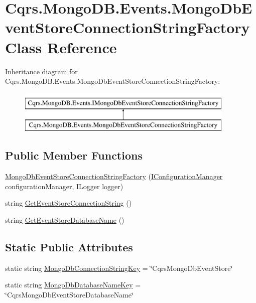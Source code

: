 \hypertarget{classCqrs_1_1MongoDB_1_1Events_1_1MongoDbEventStoreConnectionStringFactory}{}\section{Cqrs.\+Mongo\+D\+B.\+Events.\+Mongo\+Db\+Event\+Store\+Connection\+String\+Factory Class Reference}
\label{classCqrs_1_1MongoDB_1_1Events_1_1MongoDbEventStoreConnectionStringFactory}
Inheritance diagram for Cqrs.\+Mongo\+D\+B.\+Events.\+Mongo\+Db\+Event\+Store\+Connection\+String\+Factory\+:\begin{figure}[H]
\begin{center}
\leavevmode
\includegraphics[height=2.000000cm]{classCqrs_1_1MongoDB_1_1Events_1_1MongoDbEventStoreConnectionStringFactory}
\end{center}
\end{figure}
\subsection*{Public Member Functions}
\begin{DoxyCompactItemize}
\item 
\hyperlink{classCqrs_1_1MongoDB_1_1Events_1_1MongoDbEventStoreConnectionStringFactory_afb24fa31922f1297f7d7d80c7b14ee14}{Mongo\+Db\+Event\+Store\+Connection\+String\+Factory} (\hyperlink{interfaceCqrs_1_1Configuration_1_1IConfigurationManager}{I\+Configuration\+Manager} configuration\+Manager, I\+Logger logger)
\item 
string \hyperlink{classCqrs_1_1MongoDB_1_1Events_1_1MongoDbEventStoreConnectionStringFactory_af78f60c035678185ecd266019f42838b}{Get\+Event\+Store\+Connection\+String} ()
\item 
string \hyperlink{classCqrs_1_1MongoDB_1_1Events_1_1MongoDbEventStoreConnectionStringFactory_a282bda17095c8ea293f5305ea0d1b83c}{Get\+Event\+Store\+Database\+Name} ()
\end{DoxyCompactItemize}
\subsection*{Static Public Attributes}
\begin{DoxyCompactItemize}
\item 
static string \hyperlink{classCqrs_1_1MongoDB_1_1Events_1_1MongoDbEventStoreConnectionStringFactory_a0e1916a92e01f0b5cf15695478170d68}{Mongo\+Db\+Connection\+String\+Key} = \char`\"{}Cqrs\+Mongo\+Db\+Event\+Store\char`\"{}
\item 
static string \hyperlink{classCqrs_1_1MongoDB_1_1Events_1_1MongoDbEventStoreConnectionStringFactory_a5ea3576b77bf46894277b0bba8f5d2bb}{Mongo\+Db\+Database\+Name\+Key} = \char`\"{}Cqrs\+Mongo\+Db\+Event\+Store\+Database\+Name\char`\"{}
\end{DoxyCompactItemize}
